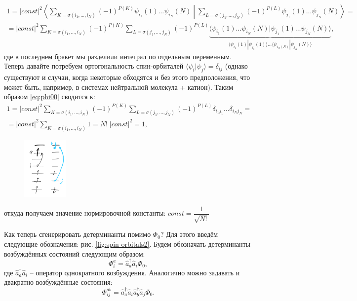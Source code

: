 \documentclass[12pt, oneside]{article}
\numberwithin{equation}{section}  %
\begin{document}
\begin{multline}
1 = |const|^2 \left\langle \sum_{K = \sigma(i_1, \dots, i_N)} (-1)^{P(K)} \psi_{i_1} (1) \dots \psi_{i_N} (N) \middle| \sum_{L = \sigma(j_1, \dots, j_N)} (-1)^{P(L)} \psi_{j_1} (1) \dots \psi_{j_N} (N) \right\rangle =\\= 
|const|^2 \sum_{K = \sigma(i_1, \dots, i_N)} (-1)^{P(K)} \sum_{L = \sigma(j_1, \dots, j_N)} (-1)^{P(L)} \underbrace{\langle \psi_{i_1} (1) \dots \psi_{i_N} (N) | \psi_{j_1} (1) \dots \psi_{j_N} (N) \rangle}_{\langle\psi_{i_1} (1) | \psi_{j_1} (1) \rangle \dots \langle \psi_{i_N(N)} | \psi_{j_N}(N) \rangle},
\label{eq:phi00}
\end{multline}
где в последнем бракет мы разделили интеграл по отдельным переменным. Теперь давайте потребуем ортогональность спин-орбиталей \(\langle \psi_i | \psi_j \rangle = \delta_{ij}\) (однако существуют и случаи, когда некоторые обходятся и без этого предположения, что может быть, например, в системах нейтральной молекула + катион). Таким образом \eqref{eq:phi00} сводится к:
\begin{multline}
1 = |const|^2 \sum_{K = \sigma(i_1, \dots, i_N)} (-1)^{P(K)} \sum_{L = \sigma(j_1, \dots, j_N)} (-1)^{P(L)} \delta_{i_1 j_1} \dots \delta_{i_N j_N} =\\=
|const|^2 \sum_{K = \sigma (i_1, \dots, i_N)} 1 = N! \; |const|^2 = 1,
\label{eq:phiphi}
\end{multline}
\begin{figure}
    \centering
    \includegraphics[width=0.2\textwidth]{./images/spin-orbitals3.png}
\end{figure}
откуда получаем значение нормировочной константы: \(const = \dfrac{1}{\sqrt{N!}}\)

Как теперь сгенерировать детерминанты помимо \(\Phi_0\)? Для этого введём следующие обозначения: рис. \ref{fig:spin-orbitals2}. Будем обозначать детерминанты возбуждённых состояний следующим образом:
\begin{equation}
\Phi_i^a = \hat{a}_a^\dag \hat{a}_i \Phi_0,
\end{equation}
где \(\hat{a}_a^\dag \hat{a}_i\) -- оператор однократного возбуждения. Аналогично можно задавать и двакратно возбуждённые состояния:
\begin{equation}
\Phi_{ij}^{ab} = \hat{a}_a^\dag \hat{a}_i \hat{a}_b^\dag \hat{a}_j \Phi_0.
\end{equation}
\end{document}
